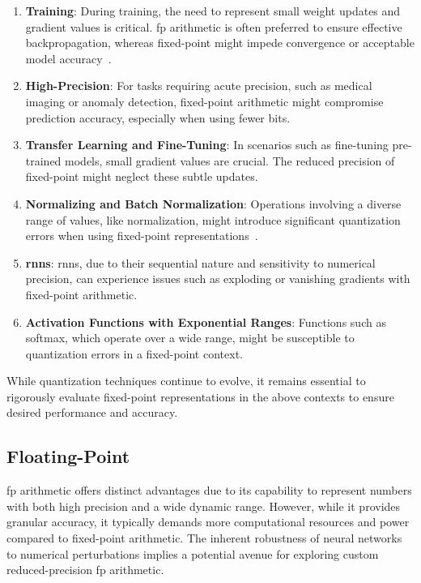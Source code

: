 \begin{enumerate}
	\item \textbf{Training}: During training, the need to represent small weight updates and gradient values is critical. \gls{fp} arithmetic is often preferred to ensure effective backpropagation, whereas fixed-point might impede convergence or acceptable model accuracy~\cite{courbariaux2014training}.
	
	\item \textbf{High-Precision}: For tasks requiring acute precision, such as medical imaging or anomaly detection, fixed-point arithmetic might compromise prediction accuracy, especially when using fewer bits.
	
	\item \textbf{Transfer Learning and Fine-Tuning}: In scenarios such as fine-tuning pre-trained models, small gradient values are crucial. The reduced precision of fixed-point might neglect these subtle updates.
	
	\item \textbf{Normalizing and Batch Normalization}: Operations involving a diverse range of values, like normalization, might introduce significant quantization errors when using fixed-point representations~\cite{jacob2018quantization}.
	
	\item \textbf{\glspl{rnn}}: \glspl{rnn}, due to their sequential nature and sensitivity to numerical precision, can experience issues such as exploding or vanishing gradients with fixed-point arithmetic.
	
	\item \textbf{Activation Functions with Exponential Ranges}: Functions such as softmax, which operate over a wide range, might be susceptible to quantization errors in a fixed-point context.
\end{enumerate}

While quantization techniques continue to evolve, it remains essential to rigorously evaluate fixed-point representations in the above contexts to ensure desired performance and accuracy.



\subsection{Floating-Point}
\gls{fp} arithmetic offers distinct advantages due to its capability to represent numbers with both high precision and a wide dynamic range. However, while it provides granular accuracy, it typically demands more computational resources and power compared to fixed-point arithmetic. The inherent robustness of neural networks to numerical perturbations implies a potential avenue for exploring custom reduced-precision \gls{fp} arithmetic.

